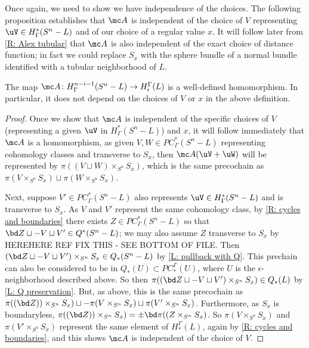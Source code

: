 \begin{example}
Once again, we need to show we have independence of the choices.
The following proposition establishes that $\mc A$ is independent of the choice of $V$ representing $\uV \in H^*_\Gamma(S^n-L)$ and of our choice of a regular value $x$.
It will follow later from \cref{R: Alex tubular} that $\mc A$ is also independent of the exact choice of distance function; in fact we could replace $S_x$ with the sphere bundle of a normal bundle identified with a tubular neighborhood of $L$.


\begin{proposition}
	The map $\mc A \colon H^{n-i-1}_\Gamma(S^n-L) \to H_i^\Gamma(L)$ is a well-defined homomorphism.
	In particular, it does not depend on the choices of $V$ or $x$ in the above definition.
\end{proposition}
\begin{proof}
	Once we show that $\mc A$ is independent of the specific choices of $V$ (representing a given $\uV$ in $H^*_\Gamma(S^n-L)$) and $x$, it will follow immediately that $\mc A$ is a homomorphism, as given $V,W\in PC^*_\Gamma(S^n-L)$ representing cohomology classes and transverse to $S_x$, then $\mc A(\uV + \uW)$ will be represented by $\pi((V \sqcup W) \times_{S^n} S_x)$, which is the same precochain as $\pi(V  \times_{S^n} S_x) \sqcup \pi(W \times_{S^n} S_x)$.

	Next, suppose $V' \in PC^*_\Gamma(S^n-L)$ also represents $\uV \in H^*_\Gamma(S^n-L)$ and is transverse to $S_x$.
	As $V$ and $V'$ represent the same cohomology class, by \cref{R: cycles and boundaries} there exists $Z \in PC^*_\Gamma(S^n-L)$ so that $\bd Z\sqcup -V \sqcup V' \in Q^*(S^n-L)$; we may also assume $Z$ transverse to $S_x$ by HEREHERE REF FIX THIS - SEE BOTTOM OF FILE.
	Then $(\bd Z \sqcup -V \sqcup V') \times_{S^n} S_x \in Q_*(S^n-L)$ by \cref{L: pullback with Q}.
	This prechain can also be considered to be in $Q_*(U) \subset PC_*^\Gamma(U)$, where $U$ is the $\epsilon$-neighborhood described above.
	So then $\pi((\bd Z \sqcup -V \sqcup V') \times_{S^n} S_x ) \in Q_*(L)$ by \cref{L: Q preservation}.
	But, as above, this is the same precochain as  $\pi((\bd Z)) \times_{S^n} S_x ) \sqcup -\pi(V  \times_{S^n} S_x) \sqcup \pi(V' \times_{S^n} S_x)$.
	Furthermore, as $S_x$ is boundaryless, $\pi((\bd Z)) \times_{S^n} S_x) = \pm \bd \pi((Z \times_{S^n} S_x)$.
	So $\pi(V  \times_{S^n} S_x)$ and $\pi(V'  \times_{S^n} S_x)$ represent the same element of $H_*^\Gamma(L)$, again by \cref{R: cycles and boundaries}, and this shows $\mc A$ is independent of the choice of $V$.


\end{proof}
\end{example}
